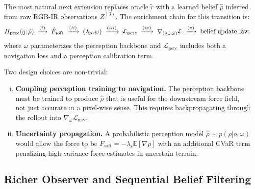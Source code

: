 The most natural next extension replaces oracle $\tilde{r}$ with a
learned belief $\hat\rho$ inferred from raw RGB-IR observations
$Z^{(3)}$.
The enrichment chain for this transition is:
\begin{equation}
  H_{\mathrm{perc}}(q;\hat\rho)
  \;\xrightarrow{(i)}\; \hat{F}_{\mathrm{soft}}
  \;\xrightarrow{(ii)}\; (\lambda_\rho, \omega)
  \;\xrightarrow{(iii)}\; \mathcal{L}_{\mathrm{perc}}
  \;\xrightarrow{(iv)}\; \nabla_{(\lambda_\rho,\omega)}\mathcal{L}
  \;\xrightarrow{(v)}\; \text{belief update law},
  \label{eq:ch7:stage3_chain}
\end{equation}
where $\omega$ parameterizes the perception backbone and
$\mathcal{L}_{\mathrm{perc}}$ includes both a navigation loss and
a perception calibration term.

Two design choices are non-trivial:
\begin{enumerate}[(i)]
  \item \textbf{Coupling perception training to navigation.}
        The perception backbone must be trained to produce
        $\hat\rho$ that is useful for the downstream force field,
        not just accurate in a pixel-wise sense.
        This requires backpropagating through the rollout into
        $\nabla_\omega\mathcal{L}_{\mathrm{nav}}$.

  \item \textbf{Uncertainty propagation.}
        A probabilistic perception model
        $\hat\rho \sim p(\rho | o, \omega)$ would allow the force
        to be $F_{\mathrm{soft}} = -\lambda_s\mathbb{E}[\nabla\rho]$
        with an additional CVaR term penalizing high-variance
        force estimates in uncertain terrain.
\end{enumerate}

\subsection{Richer Observer and Sequential Belief Filtering}
\label{subsec:ch7:filtering}

